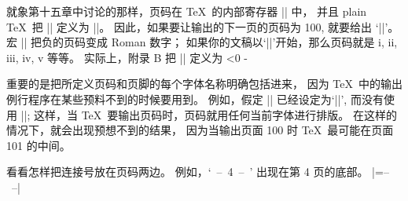 \danger 就象第十五章中讨论的那样，页码在 \TeX\ 的内部寄存器 || 中，
并且 plain \TeX\ 把 |\pageno| 定义为 ||。%
因此，如果要让输出的下一页的页码为 100, 就要给出 `||'。%
宏 |\folio| 把负的页码变成 Roman 数字；
如果你的文稿以`||'开始，那么页码就是 i, ii, iii, iv, v 等等。%
实际上，附录 B 把 |\folio| 定义为
\begintt
\ifnum\pageno<0 \romannumeral-\pageno \else\number\pageno \fi
\endtt

\danger 重要的是把所定义页码和页脚的每个字体名称明确包括进来，
因为 \TeX\ 中的输出例行程序在某些预料不到的时候要用到。%
例如，假定 |\footline| 已经设定为`|\hss\folio\hss|', 而没有使用 |\tenrm|;
这样，当 \TeX\ 要输出页码时，页码就用任何当前字体进行排版。%
在这样的情况下，就会出现预想不到的结果，
因为当输出页面 100 时 \TeX\ 最可能在页面 101 的中间。

\dangerexercise 看看怎样把连接号放在页码两边。
例如，`\hbox{ -- 4 -- }' 出现在第 4 页的底部。
\answer |\footline={\hss\tenrm-- \folio\ --\hss}|

